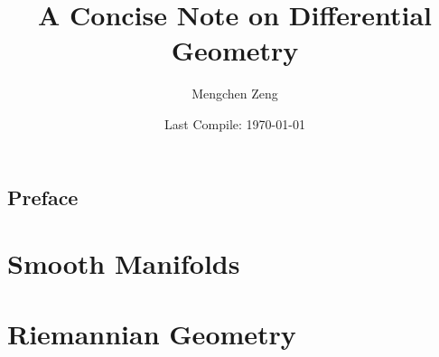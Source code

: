 \documentclass[]{book}
\title{A Concise Note on Differential Geometry}
\author{Mengchen Zeng}
\date{Last Compile: \today}
\theoremstyle{definition}
\theoremstyle{plain}
\theoremstyle{remark}
\begin{document}
\maketitle

\frontmatter

\tableofcontents
\chapter{Preface}

\mainmatter

\part{Smooth Manifolds}

\part{Riemannian Geometry}




\backmatter


\end{document}

